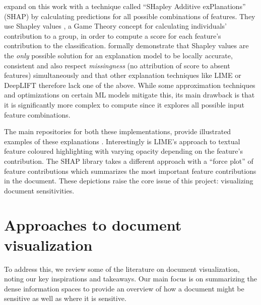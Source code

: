 \documentclass[\version]{l4proj}
\begin{document}
\textcite{lundbergUnifiedApproachInterpreting2017} expand on this work with a technique called ``SHapley Additive exPlanations'' (SHAP) by calculating predictions for all possible combinations of features.
They use Shapley values \autocite{shapleyNotesNPersonGame1951}, a Game Theory concept for calculating individuals' contribution to a group, in order to compute a score for each feature's contribution to the classification.
\textcite{lundbergUnifiedApproachInterpreting2017} formally demonstrate that Shapley values are the \textit{only} possible solution for an explanation model to be locally accurate, consistent and also respect \textit{missingness} (no attribution of score to absent features) simultaneously and that other explanation techniques like LIME or DeepLIFT therefore lack one of the above.
While some approximation techniques and optimizations on certain ML models mitigate this, its main drawback is that it is significantly more complex to compute since it explores all possible input feature combinations.

The main repositories for both these implementations, provide illustrated examples of these explanations \autocite{lundbergSlundbergShap2020,ribeiroMarcotcrLime2020}.
Interestingly is LIME's approach to textual feature coloured highlighting with varying opacity depending on the feature's contribution.
The SHAP library takes a different approach with a ``force plot'' of feature contributions which summarizes the most important feature contributions in the document.
These depictions raise the core issue of this project: visualizing document sensitivities.

\section{Approaches to document visualization}

To address this, we review some of the literature on document visualization, noting our key inspirations and takeaways.
Our main focus is on summarizing the dense information spaces to provide an overview of how a document might be sensitive as well as where it is sensitive.
\end{document}
